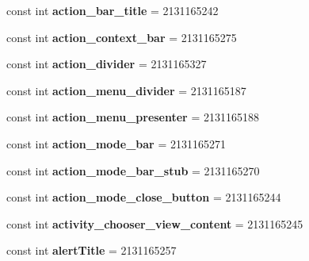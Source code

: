 \begin{DoxyCompactItemize}
const int {\bfseries action\+\_\+bar\+\_\+title} = 2131165242
\item 
\mbox{\label{classXaria_1_1Resource_1_1Id_ab0a8d1a2047f5784a9e5cac535c580a8}} 
const int {\bfseries action\+\_\+context\+\_\+bar} = 2131165275
\item 
\mbox{\label{classXaria_1_1Resource_1_1Id_a638283b84b56f878779e8f61f81acf3d}} 
const int {\bfseries action\+\_\+divider} = 2131165327
\item 
\mbox{\label{classXaria_1_1Resource_1_1Id_ade027accea24f5ac39a82af606d966b9}} 
const int {\bfseries action\+\_\+menu\+\_\+divider} = 2131165187
\item 
\mbox{\label{classXaria_1_1Resource_1_1Id_a5434b359080f8091611b9842e618cd98}} 
const int {\bfseries action\+\_\+menu\+\_\+presenter} = 2131165188
\item 
\mbox{\label{classXaria_1_1Resource_1_1Id_aac62d4e7cbdbca10619f907a2a2105cc}} 
const int {\bfseries action\+\_\+mode\+\_\+bar} = 2131165271
\item 
\mbox{\label{classXaria_1_1Resource_1_1Id_a86ecb51b55c635ae3f0e42a0f6dede6d}} 
const int {\bfseries action\+\_\+mode\+\_\+bar\+\_\+stub} = 2131165270
\item 
\mbox{\label{classXaria_1_1Resource_1_1Id_aca3017a9de1f5a8c9f3d23770d0c50ab}} 
const int {\bfseries action\+\_\+mode\+\_\+close\+\_\+button} = 2131165244
\item 
\mbox{\label{classXaria_1_1Resource_1_1Id_a1f3bf5a78d157a1d144260e9000a1a64}} 
const int {\bfseries activity\+\_\+chooser\+\_\+view\+\_\+content} = 2131165245
\item 
\mbox{\label{classXaria_1_1Resource_1_1Id_aaefd2809b0c17324bdfcea7577a8c49b}} 
const int {\bfseries alert\+Title} = 2131165257
\item 
\mbox{\label{classXaria_1_1Resource_1_1Id_a8f30408802180b8cb89925af2a0d22a1}} 

\end{DoxyCompactItemize}
